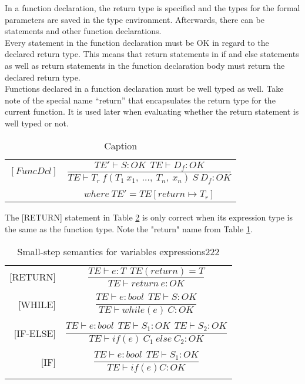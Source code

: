 In a function declaration, the return type is specified and the types for the formal parameters are saved in the type environment. Afterwards, there can be statements and other function declarations. \\
Every statement in the function declaration must be OK in regard to the declared return type. This means that return statements in if and else statements as well as return statements in the function declaration body must return the declared return type. \\
Functions declared in a function declaration must be well typed as well.
Take note of the special name “return” that encapsulates the return type for the current function. It is used later when evaluating whether the return statement is well typed or not.
\begin{table}[H]
    \begin{center}
    \begin{longtable}[c] { r c }
        $[FuncDcl]$ 
        & 
        \( \dfrac{TE' \vdash S : OK \ \ TE \vdash D_{f}: OK} 
        {T E \vdash T_r \ f(T_1 \ x_1,\ ...,\ T_n,\ x_n)\ S\ D_f : OK} \) 
        \\ \\
        & 
        \( {where \ TE' = TE[return \mapsto T_r]} \)
    \end{longtable}
    \end{center}
    \caption{Caption}
    \label{sem:func-type}
\end{table}

The [RETURN] statement in Table \ref{sem:bool-ass22} is only correct when its expression type is the same as the function type. Note the "return" name from Table \ref{sem:func-type}.
\begin{longtable}[c] { r c }
\centering

[RETURN] & \(
\dfrac{TE \vdash e : T\ \ TE(return) = T}
  {TE \vdash return \ e : OK} \) \\
& \\

[WHILE] & \(
\dfrac{TE \vdash e : bool \ \ TE \vdash S : OK}
  {TE \vdash while(e) \ C : OK} \) \\
& \\

[IF-ELSE] & \( 
\dfrac{TE \vdash e : bool \ \ TE \vdash S_1 : OK \ \ TE \vdash S_2 : OK}
  {TE \vdash if (e) \ C_1  \ else \ C_2 : OK} \) \\
& \\

[IF] & \(
\dfrac{TE \vdash e : bool \ \ TE \vdash S_1 : OK}
  {TE \vdash if (e) C : OK} \) \\

\caption{Small-step semantics for variables expressions222}
\label{sem:bool-ass22}
\end{longtable}

